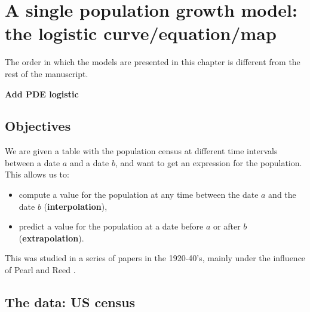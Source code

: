 \chapter{A single population growth model: the logistic curve/equation/map}
\label{chap:single_pop_growth}

The order in which the models are presented in this chapter is different from the rest of the manuscript.

\textbf{Add PDE logistic}

\section{Objectives}
We are given a table with the population census at different time intervals between a date $a$ and a date $b$, and want to get an expression for the population. This allows us to: 
\begin{itemize}
\item compute a value for the population at any time between the date $a$ and the date $b$ (\textbf{interpolation}),
\item predict a value for the population at a date before $a$ or after $b$ (\textbf{extrapolation}).
\end{itemize}


This was studied in a series of papers in the 1920-40's, mainly under the influence of Pearl and Reed \cite{PearlReed1920,PearlReed1930,PearlReedFish1940}.


\section{The data: US census}




